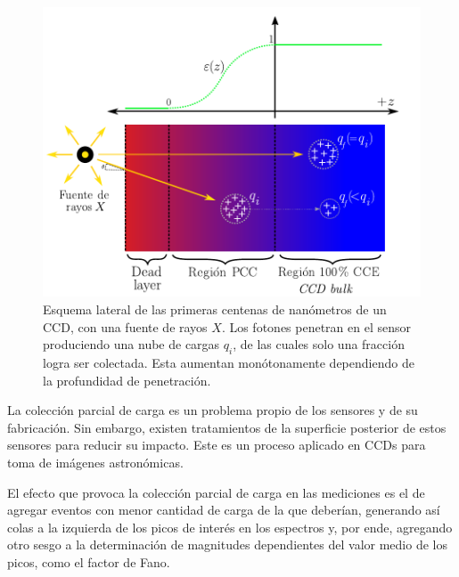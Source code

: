 \begin{figure}%
    \centering
        \includegraphics[scale=.8]{Figs/PCC.pdf}
    \caption{\footnotesize{Esquema lateral de las primeras centenas de nanómetros de un CCD, con una fuente de rayos $X$\cite{PCC-CCE}. Los fotones penetran en el sensor produciendo una nube de cargas $q_{i}$, de las cuales solo una fracción logra ser colectada. Esta aumentan monótonamente dependiendo de la profundidad de penetración.}}
    \label{fig:PCC}
\end{figure}
La colección parcial de carga es un problema propio de los sensores y de su fabricación. Sin embargo, existen tratamientos de la superficie posterior de estos sensores para reducir su impacto. Este es un proceso aplicado en CCDs para toma de imágenes astronómicas. 

El efecto que provoca la colección parcial de carga en las mediciones es el de agregar eventos con menor cantidad de carga de la que deberían, generando así colas a la izquierda de los picos de interés en los espectros y, por ende, agregando otro sesgo a la determinación de magnitudes dependientes del valor medio de los picos, como el factor de Fano.



